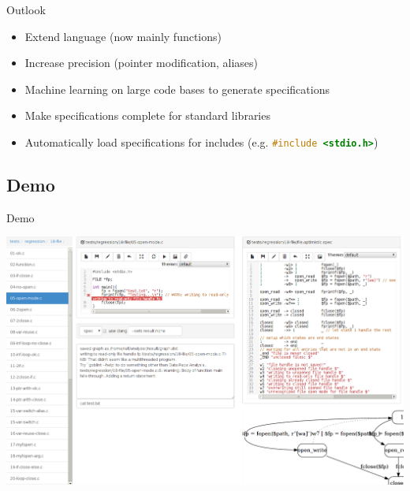 \documentclass{beamer}
\newcommand{\inlineC}[1]{\lstinline[language=C]$#1$}
\begin{document}
\begin{frame}[fragile]{Outlook}
\begin{itemize}
\item Extend language (now mainly functions)
\item Increase precision (pointer modification, aliases)
\item Machine learning on large code bases to generate specifications
\item Make specifications complete for standard libraries
\item Automatically load specifications for includes (e.g. \inlineC{#include <stdio.h>})
\end{itemize}
\end{frame}


\subsection{Demo}

\begin{frame}[fragile]{Demo}
\begin{center}
\includegraphics[width=\linewidth]{graphics/webapp_small.png}
\end{center}

\end{frame}



\end{document}

